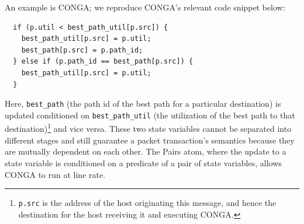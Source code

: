 An example is CONGA; we reproduce CONGA's relevant code snippet below:
\begin{verbatim}
  if (p.util < best_path_util[p.src]) {
    best_path_util[p.src] = p.util;
    best_path[p.src] = p.path_id;
  } else if (p.path_id == best_path[p.src]) {
    best_path_util[p.src] = p.util;
  }
\end{verbatim}
Here, \texttt{best\_path} (the path id of the best path for a particular
destination) is updated conditioned on \texttt{best\_path\_util} (the
utilization of the best path to that destination)\footnote{{\tt p.src} is the
address of the host originating this message, and hence the destination for the
host receiving it and executing CONGA.} and vice versa. These two state
variables cannot be separated into different stages and still guarantee a
packet transaction's semantics because they are mutually dependent on each
other.  The Pairs atom, where the update to a state variable is conditioned on
a predicate of a pair of state variables, allows CONGA to run at line rate.

